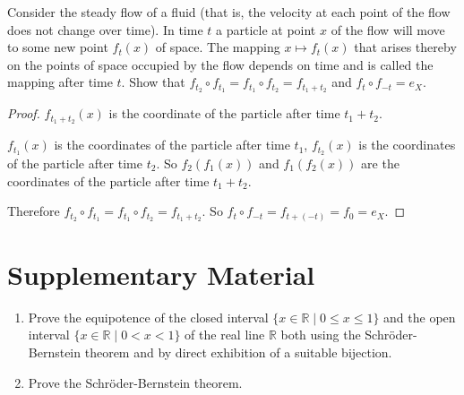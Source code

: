 \begin{exercise}
    Consider the steady flow of a fluid (that is, the velocity at each point of the flow does not change over time). In time $t$ a particle at point $x$ of the flow will move to some new point $f_{t}(x)$ of space. The mapping $x \mapsto f_{t} (x)$ that arises thereby on the points of space occupied by the flow depends on time and is called the mapping after time $t$. Show that $f_{t_{2}} \circ f_{t_{1}} = f_{t_{1}} \circ f_{t_{2}} = f_{t_{1} +t_{2}}$ and $f_{t} \circ f_{-t} = e_{X}$.
\end{exercise}

\begin{proof}
    $f_{t_{1} + t_{2}}(x)$ is the coordinate of the particle after time $t_{1} + t_{2}$.

    $f_{t_{1}}(x)$ is the coordinates of the particle after time $t_{1}$, $f_{t_{2}}(x)$ is the coordinates of the particle after time $t_{2}$. So $f_{2}(f_{1}(x))$ and $f_{1}(f_{2}(x))$ are the coordinates of the particle after time $t_{1} + t_{2}$.

    Therefore $f_{t_{2}}\circ f_{t_{1}} = f_{t_{1}}\circ f_{t_{2}} = f_{t_{1} + t_{2}}$. So $f_{t}\circ f_{-t} = f_{t + (-t)} = f_{0} = e_{X}$.
\end{proof}
\newpage

\section{Supplementary Material}

\begin{exercise}
    \begin{enumerate}[label={(\alph*)}]
        \item Prove the equipotence of the closed interval $\{ x\in \mathbb{R} \mid 0\leq x\leq 1 \}$ and the open interval $\{ x\in \mathbb{R} \mid 0 < x < 1 \}$ of the real line $\mathbb{R}$ both using the Schröder-Bernstein theorem and by direct exhibition of a suitable bijection.
        \item Prove the Schröder-Bernstein theorem.
    \end{enumerate}
\end{exercise}

